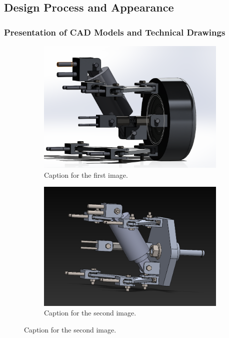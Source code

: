 \subsection{Design Process and Appearance}
\subsubsection{Presentation of CAD Models and Technical Drawings}
\begin{figure}[ht!]
  \centering
  \begin{subfigure}{.5\textwidth}
    \centering
    \includegraphics[width=\linewidth]{texfiles/mech/eimg/suspension/CAD_Deign of Rear Suspension.png}
    \caption{Caption for the first image.}
    \label{fig:sub1}
  \end{subfigure}%
  \begin{subfigure}{.5\textwidth}
    \centering
    \includegraphics[width=\linewidth]{texfiles/mech/eimg/suspension/CAD Design Front wishbone Assembly.png}
    \caption{Caption for the second image.}
    \label{fig:sub2}
  \end{subfigure}%
\end{figure}
